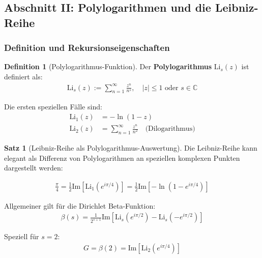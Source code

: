 \documentclass[a4paper,12pt,twoside]{report}
\theoremstyle{definition}
\newtheorem{definition}{Definition}
\newtheorem{satz}{Satz}
\begin{document}
\subsection{Abschnitt II: Polylogarithmen und die Leibniz-Reihe}

\subsubsection{Definition und Rekursionseigenschaften}

\begin{definition}[Polylogarithmus-Funktion]
Der \textbf{Polylogarithmus} $\text{Li}_s(z)$ ist definiert als:
\begin{align}
	\text{Li}_s(z) := \sum_{n=1}^{\infty} \frac{z^n}{n^s}, \quad |z| \leq 1 \text{ oder } s \in \mathbb{C}
	\label{eq:polylog_def}
\end{align}

Die ersten speziellen Fälle sind:
\begin{align}
	\text{Li}_1(z) &= -\ln(1-z) \\
	\text{Li}_2(z) &= \sum_{n=1}^{\infty} \frac{z^n}{n^2} \quad \text{(Dilogarithmus)}
\end{align}
\end{definition}

\begin{satz}[Leibniz-Reihe als Polylogarithmus-Auswertung]
Die Leibniz-Reihe kann elegant als Differenz von Polylogarithmen an speziellen komplexen Punkten dargestellt werden:

\begin{align}
	\frac{\pi}{4} = \frac{1}{2} \text{Im}[\text{Li}_1(e^{i\pi/4})] = \frac{1}{2} \text{Im}[-\ln(1 - e^{i\pi/4})]
	\label{eq:leibniz_polylog_1}
\end{align}

Allgemeiner gilt für die Dirichlet Beta-Funktion:
\begin{align}
	\beta(s) = \frac{1}{2^{s+1}} \text{Im}[\text{Li}_s(e^{i\pi/2}) - \text{Li}_s(-e^{i\pi/2})]
	\label{eq:beta_polylog}
\end{align}

Speziell für $s = 2$:
\begin{align}
	G = \beta(2) = \text{Im}[\text{Li}_2(e^{i\pi/4})]
	\label{eq:catalan_polylog}
\end{align}
\end{satz}
\end{document}
